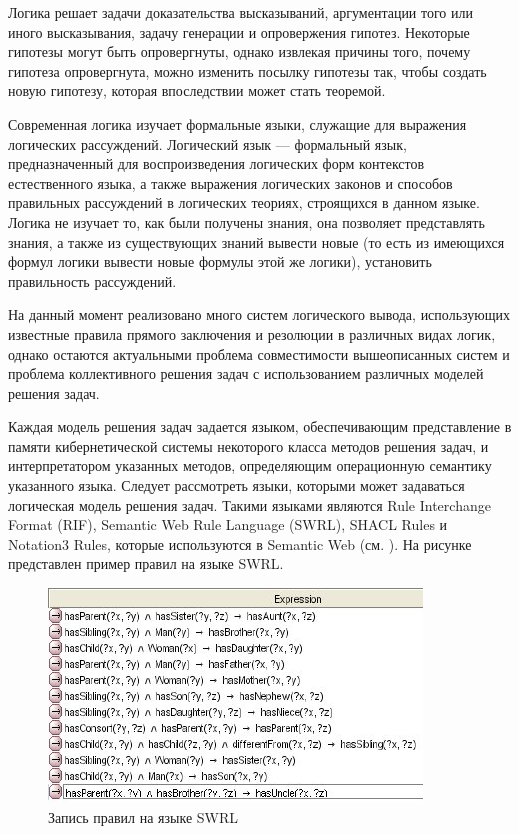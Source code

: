 Логика решает задачи доказательства высказываний, аргументации того или иного высказывания, задачу генерации и опровержения гипотез. Некоторые гипотезы могут быть опровергнуты, однако извлекая причины того, почему гипотеза опровергнута, можно изменить посылку гипотезы так, чтобы создать новую гипотезу, которая впоследствии может стать теоремой.

Современная логика изучает формальные языки, служащие для выражения логических рассуждений. Логический язык — формальный язык, предназначенный для воспроизведения логических форм контекстов естественного языка, а также выражения логических законов и способов правильных рассуждений в логических теориях, строящихся в данном языке. Логика не изучает то, как были получены знания, она позволяет представлять знания, а также из существующих знаний вывести новые (то есть из имеющихся формул логики вывести новые формулы этой же логики), установить правильность рассуждений.

На данный момент реализовано много систем логического вывода, использующих известные правила прямого заключения и резолюции в различных видах логик, однако остаются актуальными проблема совместимости вышеописанных систем и проблема коллективного решения задач с использованием различных моделей решения задач.

Каждая модель решения задач задается языком, обеспечивающим представление в памяти кибернетической системы некоторого класса методов решения задач, и интерпретатором указанных методов, определяющим операционную семантику указанного языка. Следует рассмотреть языки, которыми может задаваться логическая модель решения задач. Такими языками являются Rule Interchange Format (RIF), Semantic Web Rule Language (SWRL), SHACL Rules и Notation3 Rules, которые используются в Semantic Web (см. ). На рисунке  представлен пример правил на языке SWRL.

\begin{figure}[http]
	\includegraphics[scale=0.8]{author/part3/figures/swrl_example.png}
	\caption{Запись правил на языке SWRL}
	\label{fig:swrl_example}
\end{figure}

